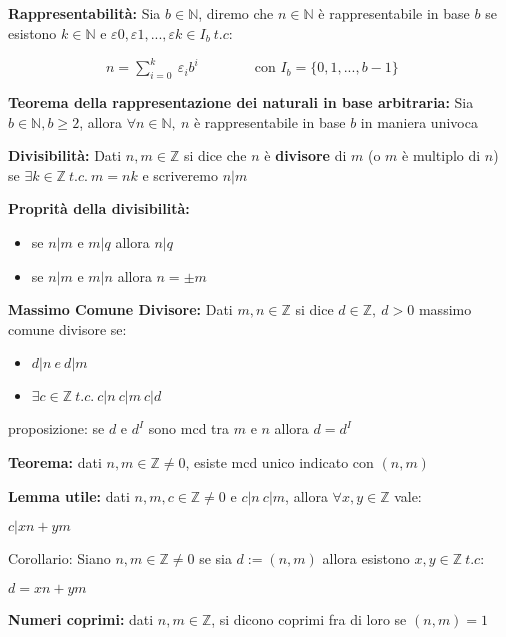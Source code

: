 \documentclass[11pt, letterpaper]{article}
\begin{document}
\textbf{Rappresentabilità:} Sia $b\in\mathbb{N}$, diremo che $n\in\mathbb{N}$ è rappresentabile in base
$b$ se esistono $k\in\mathbb{N}$ e $\varepsilon{0},\varepsilon{1},...,\varepsilon{k}\in I_{b}\ t.c:$
\begin{center}
    \ \ \ \ \ \ \ \ \ \ \ \ \ \ $n = \sum_{i=0}^{k}\ \varepsilon_{i}b^{i}$\ \ \ \ \ \ \ \ con $I_{b}=\{0,1,...,b-1\}$
\end{center} 

\textbf{Teorema della rappresentazione dei naturali in base arbitraria:} Sia $b\in\mathbb{N}, b\geq 2$, allora
$\forall n\in\mathbb{N},\ n$ è rappresentabile in base $b$ in maniera univoca

\textbf{Divisibilità:} Dati $n,m\in\mathbb{Z}$ si dice che $n$ è \textbf{divisore} di $m$ (o $m$ è multiplo
di $n$) se $\exists k\in\mathbb{Z}\ t.c.\ m=nk$ e scriveremo $n|m$

\textbf{Proprità della divisibilità:}
\begin{itemize}
    \item se $n|m$ e $m|q$ allora $n|q$
    \item se $n|m$ e $m|n$ allora $n=\pm m$
\end{itemize}

\textbf{Massimo Comune Divisore:} Dati $m,n\in\mathbb{Z}$ si dice $d\in\mathbb{Z},\ d>0$ massimo comune divisore
se:
\begin{itemize}
    \item $d|n\ e\ d|m$
    \item $\exists c\in\mathbb{Z}\ t.c.\ c|n\ c|m\ c|d$
\end{itemize} 

proposizione: se $d$ e $d^{I}$ sono mcd tra $m$ e $n$ allora $d=d^{I}$

\textbf{Teorema:} dati $n,m\in\mathbb{Z} \neq 0$, esiste mcd unico indicato con $(n,m)$

\textbf{Lemma utile:} dati $n,m,c\in\mathbb{Z} \neq 0$ e $c|n\ c|m$, allora $\forall x,y\in\mathbb{Z}$ vale:
\begin{center}
    $c|xn+ym$
\end{center}

Corollario: Siano $n,m\in\mathbb{Z} \neq 0$ se sia $d:=(n,m)$ allora esistono $x,y\in\mathbb{Z}\ t.c:$
\begin{center}
    $d=xn+ym$
\end{center}

\textbf{Numeri coprimi:} dati $n,m\in\mathbb{Z}$, si dicono coprimi fra di loro se $(n,m)=1$
\end{document}

